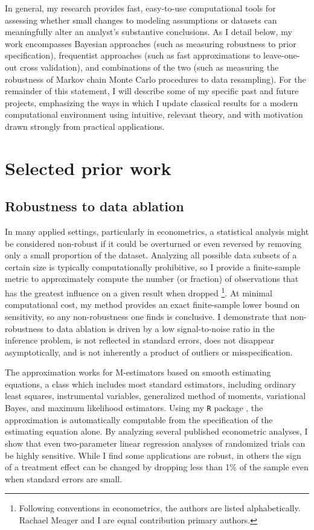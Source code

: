 In general, my research provides fast, easy-to-use computational tools for
assessing whether small changes to modeling assumptions or datasets can
meaningfully alter an analyst's substantive conclusions.  As I detail below, my
work encompasses Bayesian approaches (such as measuring robustness to prior
specification), frequentist approaches (such as fast approximations to
leave-one-out cross validation), and combinations of the two (such as measuring
the robustness of Markov chain Monte Carlo procedures to data resampling). For
the remainder of this statement, I will describe some of my specific past and
future projects, emphasizing the ways in which I update classical results for a
modern computational environment using intuitive, relevant theory, and with
motivation drawn strongly from practical applications.

\section{Selected prior work}

\subsection{Robustness to data ablation}
%
In many applied settings, particularly in econometrics, a statistical analysis
might be considered non-robust if it could be overturned or even reversed by
removing only a small proportion of the dataset. Analyzing all possible data
subsets of a certain size is typically computationally prohibitive, so I provide
a finite-sample metric to approximately compute the number (or fraction) of
observations that has the greatest influence on a given result when dropped
\citep{giordano:2020:amip}\footnote{Following conventions in econometrics, the
authors are listed alphabetically.  Rachael Meager and I are equal contribution
primary authors.}.  At minimal computational cost, my method provides an exact
finite-sample lower bound on sensitivity, so any non-robustness one finds is
conclusive. I demonstrate that non-robustness to data ablation is driven by a
low signal-to-noise ratio in the inference problem, is not reflected in standard
errors, does not disappear asymptotically, and is not inherently a product of
outliers or misspecification.

The approximation works for M-estimators based on smooth estimating equations, a
class which includes most standard estimators, including ordinary least squares,
instrumental variables, generalized method of moments, variational Bayes, and
maximum likelihood estimators. Using my \texttt{R} package \citep{zaminfluence},
the approximation is automatically computable from the specification of the
estimating equation alone.  By analyzing several published econometric analyses,
I show that even two-parameter linear regression analyses of randomized trials
can be highly sensitive.  While I find some applications are robust, in others
the sign of a treatment effect can be changed by dropping less than 1\% of the
sample even when standard errors are small.


